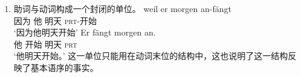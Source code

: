 \begin{enumerate}
\item 助词与动词构成一个封闭的单位。
\eal
\ex 
\gll weil er morgen an-fängt\\
     因为 他 明天 \textsc{prt}-开始\\
\glt `因为他明天开始'
\ex 
\gll Er fängt morgen an.\\
	 他 开始 明天 \textsc{prt}\\
\glt `他明天开始。'
\zl
这一单位只能用在动词末位的结构中，这也说明了这一结构反映了基本语序的事实。


\end{enumerate}
